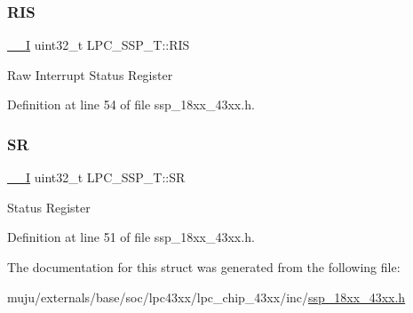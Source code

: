 \subsubsection{\texorpdfstring{R\+IS}{RIS}}
{\footnotesize\ttfamily \hyperlink{core__sc300_8h_af63697ed9952cc71e1225efe205f6cd3}{\+\_\+\+\_\+I} uint32\+\_\+t L\+P\+C\+\_\+\+S\+S\+P\+\_\+\+T\+::\+R\+IS}

Raw Interrupt Status Register 

Definition at line 54 of file ssp\+\_\+18xx\+\_\+43xx.\+h.

\mbox{\label{struct_l_p_c___s_s_p___t_a5f6421682b9a321abc8d4c91a6dbd964}} 
\subsubsection{\texorpdfstring{SR}{SR}}
{\footnotesize\ttfamily \hyperlink{core__sc300_8h_af63697ed9952cc71e1225efe205f6cd3}{\+\_\+\+\_\+I} uint32\+\_\+t L\+P\+C\+\_\+\+S\+S\+P\+\_\+\+T\+::\+SR}

Status Register 

Definition at line 51 of file ssp\+\_\+18xx\+\_\+43xx.\+h.



The documentation for this struct was generated from the following file\+:\begin{DoxyCompactItemize}
\item 
muju/externals/base/soc/lpc43xx/lpc\+\_\+chip\+\_\+43xx/inc/\hyperlink{ssp__18xx__43xx_8h}{ssp\+\_\+18xx\+\_\+43xx.\+h}\end{DoxyCompactItemize}
